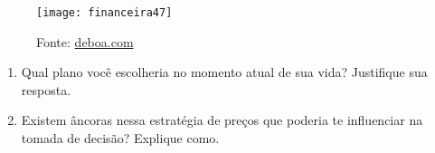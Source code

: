 \begin{enumerate}
  \begin{figure}[H]
  \centering

  \texttt{[image: financeira47]}
  \caption{Fonte: \href{http://brasilia.deboa.com/dicas-descontos/academia-esportiva-status-planos-com-desconto. }{deboa.com}}
  \end{figure}

  \begin{enumerate}
  \item Qual plano você escolheria no momento atual de sua vida? Justifique sua resposta.
  \item Existem âncoras nessa estratégia de preços que poderia te influenciar na tomada de decisão? Explique como.
  \end{enumerate}
\end{enumerate}
\clearpage

